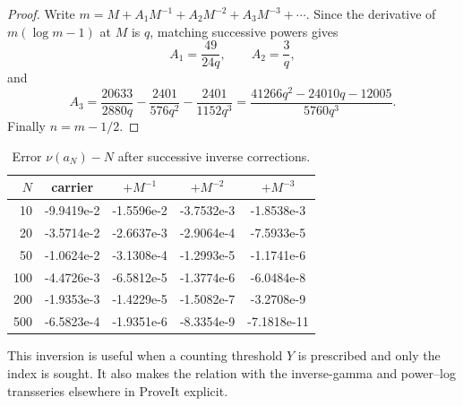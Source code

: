 \documentclass[11pt,a4paper]{article}
\theoremstyle{definition}
\theoremstyle{remark}
\begin{document}
\begin{proof}
Write \(m=M+A_1M^{-1}+A_2M^{-2}+A_3M^{-3}+\cdots\).  Since the derivative of \(m(\log m-1)\) at \(M\) is \(q\), matching successive powers gives
\[
 A_1=\frac{49}{24q},\qquad A_2=\frac3q,
\]
and
\[
 A_3=\frac{20633}{2880q}-\frac{2401}{576q^2}-\frac{2401}{1152q^3}
 =\frac{41266q^2-24010q-12005}{5760q^3}.
\]
Finally \(n=m-1/2\).
\end{proof}

\begin{table}[ht]
\centering
\caption{Error \(\nu(a_N)-N\) after successive inverse corrections.}
\label{tab:inverse}
\small
\begin{tabular}{rcccc}
\toprule
\(N\)&carrier&\(+M^{-1}\)&\(+M^{-2}\)&\(+M^{-3}\)\\
\midrule
10  &-9.9419e-2&-1.5596e-2&-3.7532e-3&-1.8538e-3\\
20  &-3.5714e-2&-2.6637e-3&-2.9064e-4&-7.5933e-5\\
50  &-1.0624e-2&-3.1308e-4&-1.2993e-5&-1.1741e-6\\
100 &-4.4726e-3&-6.5812e-5&-1.3774e-6&-6.0484e-8\\
200 &-1.9353e-3&-1.4229e-5&-1.5082e-7&-3.2708e-9\\
500 &-6.5823e-4&-1.9351e-6&-8.3354e-9&-7.1818e-11\\
\bottomrule
\end{tabular}
\end{table}

This inversion is useful when a counting threshold \(Y\) is prescribed and only the index is sought.  It also makes the relation with the inverse-gamma and power--log transseries elsewhere in ProveIt explicit.
\end{document}
